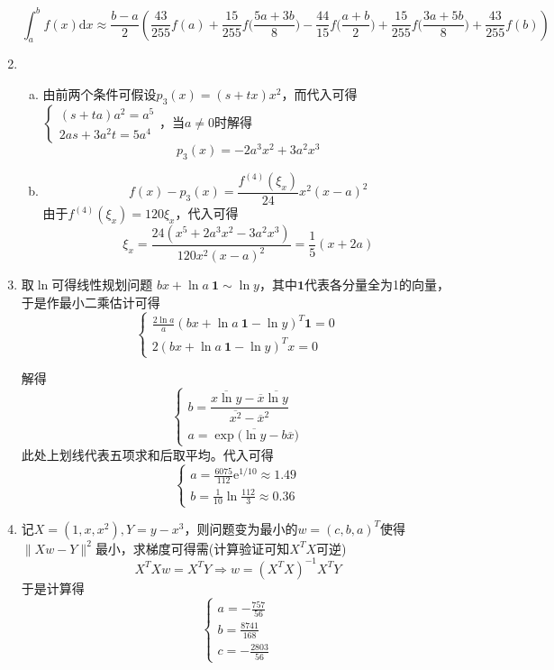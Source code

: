 \documentclass[a4paper,UTF8,fontset=windows]{ctexart}
\begin{document}
\begin{enumerate}
    $$\int_a^bf(x)\mathrm{d}x\approx\frac{b-a}{2}\left(\frac{43}{255}f(a)+\frac{15}{255}f\bigg(\frac{5a+3b}{8}\bigg)-\frac{44}{15}f\bigg(\frac{a+b}{2}\bigg)+\frac{15}{255}f\bigg(\frac{3a+5b}{8}\bigg)+\frac{43}{255}f(b)\right)$$
    
    \item
    \begin{enumerate}[(a)]
        \item 
        由前两个条件可假设$p_3(x)=(s+tx)x^2$，而代入可得$\begin{cases}(s+ta)a^2=a^5\\2as+3a^2t=5a^4\end{cases}$，当$a\ne0$时解得
        $$p_3(x)=-2a^3x^2+3a^2x^3$$
    
        \item
        $$f(x)-p_3(x)=\frac{f^{(4)}(\xi_x)}{24}x^2(x-a)^2$$
        由于$f^(4)(\xi_x)=120\xi_x$，代入可得
        $$\xi_x=\frac{24(x^5+2a^3x^2-3a^2x^3)}{120x^2(x-a)^2}=\frac{1}{5}(x+2a)$$
    \end{enumerate}
    
    \item
    取$\ln$可得线性规划问题 $bx+\ln a\ \mathbf{1}\sim\ln y$，其中$\mathbf{1}$代表各分量全为1的向量，于是作最小二乘估计可得
    $$\begin{cases}\frac{2\ln a}{a}(bx+\ln a\ \mathbf{1}-\ln y)^T\mathbf{1}=0\\2(bx+\ln a\ \mathbf{1}-\ln y)^Tx=0\end{cases}$$
    
    解得
    $$\begin{cases}
        b=\dfrac{\overline{x\ln y}-\overline{x}\overline{\ln y}}{\overline{x^2}-\overline{x}^2}
        \\a=\exp\big(\overline{\ln y}-b\overline{x}\big)\end{cases}$$
    此处上划线代表五项求和后取平均。代入可得
    $$\begin{cases}a=\frac{6075}{112}\mathrm{e}^{1/10}\approx1.49\\b=\frac{1}{10}\ln\frac{112}{3}\approx0.36\end{cases}$$
    
    \item
    记$X=(1,x,x^2),Y=y-x^3$，则问题变为最小的$w=(c,b,a)^T$使得$\|Xw-Y\|^2$最小，求梯度可得需(计算验证可知$X^TX$可逆)
    $$X^TXw=X^TY\Rightarrow w=(X^TX)^{-1}X^TY$$
    于是计算得
    $$\begin{cases}a=-\frac{757}{56}\\b=\frac{8741}{168}\\c=-\frac{2803}{56}\end{cases}$$
\end{enumerate}
\end{document}
